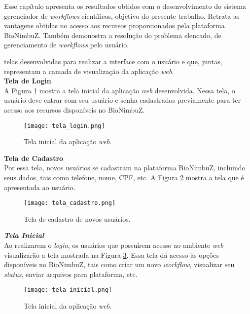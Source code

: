 Esse capítulo apresenta os resultados obtidos com o desenvolvimento do sistema gerenciador de \textit{workflows} científicos, objetivo do presente trabalho. Retrata as vantagens obtidas no acesso aos recursos proporcionados pela plataforma BioNimbuZ. Também demonostra a resolução do problema elencado, de gerenciamento de \textit{workflows} pelo usuário. 

telas desenvolvidas para realizar a interface com o usuário e que, juntas, representam a camada de visualização da aplicação \textit{web}. \\

\noindent
\textbf{Tela de Login} \\

\noindent
A Figura \ref{fig:tela_login} mostra a tela inicial da aplicação \textit{web} desenvolvida. Nessa tela, o usuário deve entrar com seu usuário e senha cadastrados previamente para ter acesso aos recursos disponíveis no BioNimbuZ.

\begin{figure}[H]
	\centering
	\texttt{[image: tela\_login.png]}
	\caption{Tela inicial da aplicação \textit{web}.}
	\label{fig:tela_login}
\end{figure}

\noindent
\textbf{Tela de Cadastro} \\

\noindent
Por essa tela, novos usuários se cadastram na plataforma BioNimbuZ, incluindo seus dados, tais como telefone, nome, CPF, etc. A Figura \ref{fig:tela_cadastro} mostra a tela que é apresentada ao usuário.

\begin{figure}[H]
	\centering
	\texttt{[image: tela\_cadastro.png]}
	\caption{Tela de cadastro de novos usuários.}
	\label{fig:tela_cadastro}
\end{figure}

\noindent
\textbf{\textit{Tela Inicial}} \\

\noindent
Ao realizarem o \textit{login}, os usuários que possuírem acesso ao ambiente \textit{web} visualizarão a tela mostrada na Figura \ref{fig:tela_inicial}. Essa tela dá acesso às opções disponíveis no BioNimbuZ, tais como criar um novo \textit{workflow}, visualizar seu \textit{status}, enviar arquivos para plataforma, etc.

\begin{figure}[H]
	\centering
	\texttt{[image: tela\_inicial.png]}
	\caption{Tela inicial da aplicação \textit{web}.}
	\label{fig:tela_inicial}
\end{figure}

